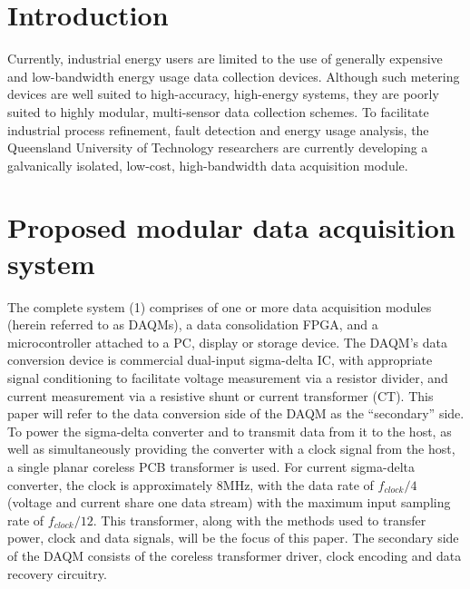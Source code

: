 \documentclass[conference]{IEEEtran}
\begin{document}
\section{Introduction}

Currently, industrial energy users are limited to the use of generally expensive and low-bandwidth energy usage data collection devices. Although such metering devices are well suited to high-accuracy, high-energy systems, they are poorly suited to highly modular, multi-sensor data collection schemes.  To facilitate industrial process refinement, fault detection and energy usage analysis, the Queensland University of Technology researchers are currently developing a galvanically isolated, low-cost, high-bandwidth data acquisition module. 


\section{Proposed modular data acquisition system}

The complete system (\figurename{1}) comprises of one or more data acquisition modules (herein referred to as DAQMs), a data consolidation FPGA, and a microcontroller attached to a PC, display or storage device.  
The DAQM's data conversion device is commercial dual-input sigma-delta IC, with appropriate signal conditioning to facilitate voltage measurement via a resistor divider, and current measurement via a resistive shunt or current transformer (CT).  This paper will refer to the data conversion side of the DAQM as the ``secondary'' side.  To power the sigma-delta converter and to transmit data from it to the host, as well as simultaneously providing the converter with a clock signal from the host, a single planar coreless PCB transformer is used.  For current sigma-delta converter, the clock is approximately 8MHz, with the data rate of $ f_{clock}/4 $ (voltage and current share one data stream) with the maximum input sampling rate of $ f_{clock}/12 $.
This transformer, along with the methods used to transfer power, clock and data signals, will be the focus of this paper.  The secondary side of the DAQM consists of the coreless transformer driver, clock encoding and data recovery circuitry.  
\end{document}
